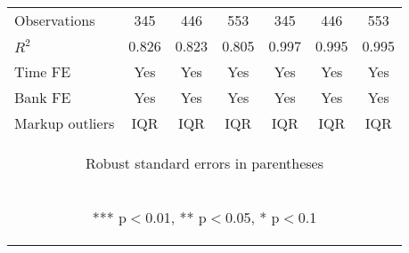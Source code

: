 \begin{tabular}{lcccccc}
Observations & 345 & 446 & 553 & 345 & 446 & 553 \\
$R^2$ & 0.826 & 0.823 & 0.805 & 0.997 & 0.995 & 0.995 \\
Time FE & Yes & Yes & Yes & Yes & Yes & Yes \\
Bank FE & Yes & Yes & Yes & Yes & Yes & Yes \\
 Markup outliers & IQR & IQR & IQR & IQR & IQR & IQR \\ \hline
\multicolumn{7}{c}{\begin{footnotesize} Robust standard errors in parentheses\end{footnotesize}} \\
\multicolumn{7}{c}{\begin{footnotesize} *** p$<$0.01, ** p$<$0.05, * p$<$0.1\end{footnotesize}} \\
\end{tabular}


